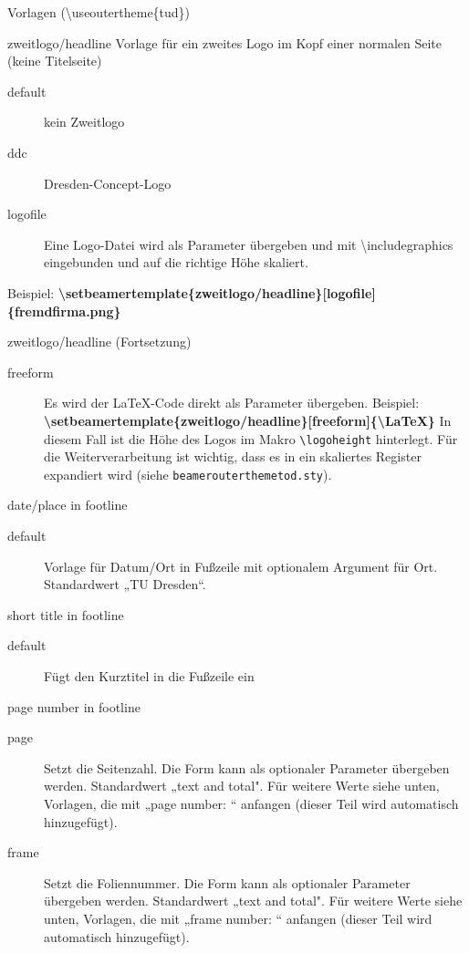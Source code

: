 \documentclass[presentation,t]{beamer}
\begin{document}
\begin{frame}[allowframebreaks]{Vorlagen (\textbackslash useoutertheme\{tud\})}
\begin{block}{zweitlogo/headline}
Vorlage für ein zweites Logo im Kopf einer normalen Seite (keine Titelseite)
\begin{description}
\item[{default}] kein Zweitlogo
\item[{ddc}] Dresden-Concept-Logo
\item[{logofile}] Eine Logo-Datei wird als Parameter übergeben und mit
\textbackslash includegraphics eingebunden und auf die
richtige Höhe skaliert.
\end{description}
Beispiel: 
\textbf{\textbackslash setbeamertemplate\{zweitlogo/headline\}[logofile]\{fremdfirma.png\}}
\end{block}
\begin{block}{zweitlogo/headline (Fortsetzung)}
\begin{description}
\item[{freeform}] Es wird der \LaTeX -Code direkt als Parameter übergeben. Beispiel:
\textbf{\textbackslash setbeamertemplate\{zweitlogo/headline\}[freeform]\{\textbackslash LaTeX\}}
In diesem Fall ist die Höhe des Logos im Makro
\texttt{\textbackslash logoheight} hinterlegt. Für die
Weiterverarbeitung ist wichtig, dass es in ein
skaliertes Register expandiert wird (siehe
\texttt{beamerouterthemetod.sty}).
\end{description}
\end{block}

\begin{block}{date/place in footline}
\begin{description}
\item[{default}] Vorlage für Datum/Ort in Fußzeile mit optionalem Argument
für Ort. Standardwert „TU Dresden“.
\end{description}
\end{block}

\begin{block}{short title in footline}
\begin{description}
\item[{default}] Fügt den Kurztitel in die Fußzeile ein
\end{description}
\end{block}

\begin{block}{page number in footline}
\small
\begin{description}
\item[{page}] Setzt die Seitenzahl. Die Form kann als optionaler Parameter
übergeben werden. Standardwert „text and total". Für weitere Werte
siehe unten, Vorlagen, die mit „page number: “ anfangen (dieser Teil
wird automatisch hinzugefügt).
\item[{frame}] Setzt die Foliennummer. Die Form kann als optionaler Parameter
übergeben werden. Standardwert „text and total". Für weitere Werte
siehe unten, Vorlagen, die mit „frame number: “ anfangen (dieser Teil
wird automatisch hinzugefügt).
\end{description}
\end{block}


\end{frame}
\end{document}
